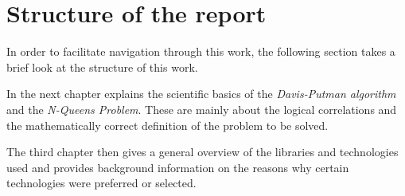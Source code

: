 \section{Structure of the report}
\label{sec:introStructure}
In order to facilitate navigation through this work, the following section takes a brief look at the structure of this work.

In the next chapter explains the scientific basics of the \textit{Davis-Putman algorithm} and the \textit{N-Queens Problem}. These are mainly about the logical correlations and the mathematically correct definition of the problem to be solved.

The third chapter then gives a general overview of the libraries and technologies used and provides background information on the reasons why certain technologies were preferred or selected.

